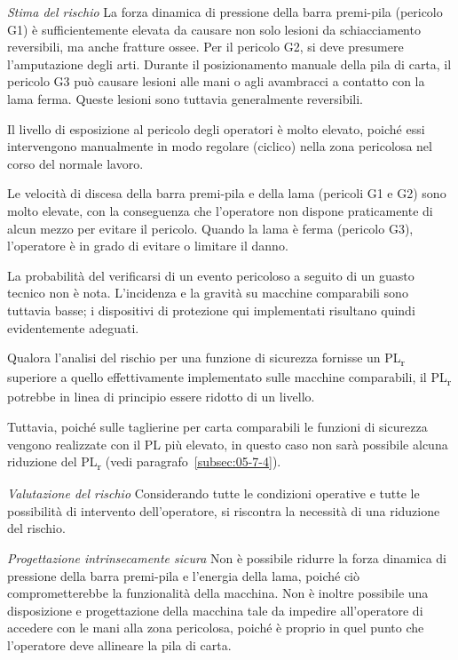 \textit{Stima del rischio}
La forza dinamica di pressione della barra premi-pila (pericolo G1) è sufficientemente elevata da causare non solo lesioni da schiacciamento reversibili, ma anche fratture ossee. Per il pericolo G2, si deve presumere l'amputazione degli arti. Durante il posizionamento manuale della pila di carta, il pericolo G3 può causare lesioni alle mani o agli avambracci a contatto con la lama ferma. Queste lesioni sono tuttavia generalmente reversibili.

Il livello di esposizione al pericolo degli operatori è molto elevato, poiché essi intervengono manualmente in modo regolare (ciclico) nella zona pericolosa nel corso del normale lavoro.

Le velocità di discesa della barra premi-pila e della lama (pericoli G1 e G2) sono molto elevate, con la conseguenza che l'operatore non dispone praticamente di alcun mezzo per evitare il pericolo. Quando la lama è ferma (pericolo G3), l'operatore è in grado di evitare o limitare il danno.

La probabilità del verificarsi di un evento pericoloso a seguito di un guasto tecnico non è nota. L'incidenza e la gravità su macchine comparabili sono tuttavia basse; i dispositivi di protezione qui implementati risultano quindi evidentemente adeguati.

Qualora l'analisi del rischio per una funzione di sicurezza fornisse un PL\textsubscript{r} superiore a quello effettivamente implementato sulle macchine comparabili, il PL\textsubscript{\small r} potrebbe in linea di principio essere ridotto di un livello.

Tuttavia, poiché sulle taglierine per carta comparabili le funzioni di sicurezza vengono realizzate con il PL più elevato, in questo caso non sarà possibile alcuna riduzione del PL\textsubscript{\small r} (vedi paragrafo~\ref{subsec:05-7-4}).

\textit{Valutazione del rischio}
Considerando tutte le condizioni operative e tutte le possibilità di intervento dell'operatore, si riscontra la necessità di una riduzione del rischio.

\textit{Progettazione intrinsecamente sicura}
Non è possibile ridurre la forza dinamica di pressione della barra premi-pila e l'energia della lama, poiché ciò comprometterebbe la funzionalità della macchina. Non è inoltre possibile una disposizione e progettazione della macchina tale da impedire all'operatore di accedere con le mani alla zona pericolosa, poiché è proprio in quel punto che l'operatore deve allineare la pila di carta.

